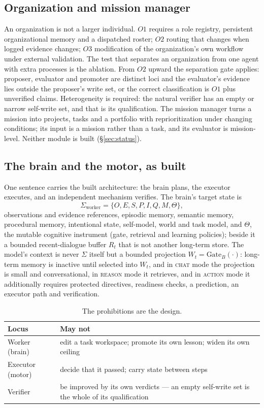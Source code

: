 \subsection{Organization and mission manager}

An organization is not a larger individual. $O1$ requires a role registry, persistent organizational memory and a dispatched roster; $O2$ routing that changes when logged evidence changes; $O3$ modification of the organization's own workflow under external validation. The test that separates an organization from one agent with extra processes is the ablation. From $O2$ upward the separation gate applies: proposer, evaluator and promoter are distinct loci and the evaluator's evidence lies outside the proposer's write set, or the correct classification is $O1$ plus unverified claims. Heterogeneity is required: the natural verifier has an empty or narrow self-write set, and that is its qualification. The mission manager turns a mission into projects, tasks and a portfolio with reprioritization under changing conditions; its input is a mission rather than a task, and its evaluator is mission-level. Neither module is built (\S\ref{sec:status}).

\subsection{The brain and the motor, as built}\label{sec:brainmotor}

One sentence carries the built architecture: the brain plans, the executor executes, and an independent mechanism verifies. The brain's target state is
\[
\Sigma_{\text{worker}} = \{O, E, S, P, I, Q, M, \Theta\},
\]
observations and evidence references, episodic memory, semantic memory, procedural memory, intentional state, self-model, world and task model, and $\Theta$, the mutable cognitive instrument (gate, retrieval and learning policies); beside it a bounded recent-dialogue buffer $R_t$ that is not another long-term store. The model's context is never $\Sigma$ itself but a bounded projection $W_t = \text{Gate}_B(\cdot)$: long-term memory is inactive until selected into $W_t$, and in \textsc{chat} mode the projection is small and conversational, in \textsc{reason} mode it retrieves, and in \textsc{action} mode it additionally requires protected directives, readiness checks, a prediction, an executor path and verification.

\begin{table}[!htbp]
\centering\small
\begin{tabularx}{\textwidth}{@{}lY@{}}
\toprule
Locus & May not \\
\midrule
Worker (brain) & edit a task workspace; promote its own lesson; widen its own ceiling \\
Executor (motor) & decide that it passed; carry state between steps \\
Verifier & be improved by its own verdicts --- an empty self-write set is the whole of its qualification \\
\bottomrule
\end{tabularx}
\caption{The prohibitions are the design.}
\label{tab:prohibit}
\end{table}

